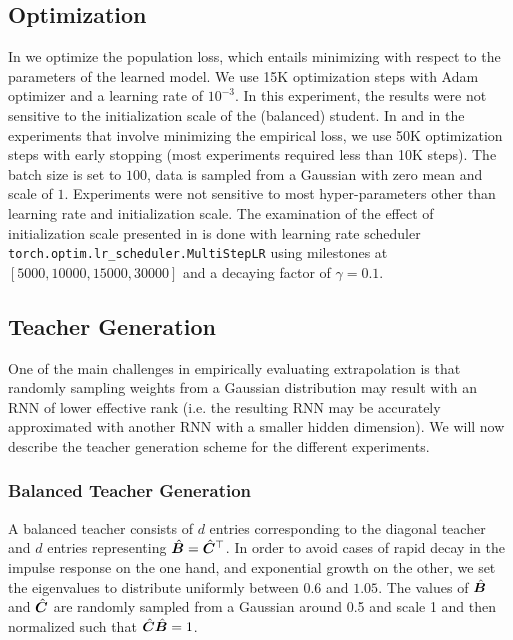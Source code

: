 \subsection{Optimization}
In  we optimize the population loss, which entails minimizing  with respect to the parameters of the learned model. We use 15K optimization steps with Adam optimizer and a learning rate of $10^{-3}$. In this experiment, the results were not sensitive to the initialization scale of the (balanced) student.
In  and  in the experiments that involve minimizing the empirical loss, we use 50K optimization steps with early stopping (most experiments required less than 10K steps). The batch size is set to $100$, data is sampled from a Gaussian with zero mean and scale of $1$. Experiments were not sensitive to most hyper-parameters other than learning rate and initialization scale. The examination of the effect of initialization scale presented in  is done with learning rate scheduler \verb|torch.optim.lr_scheduler.MultiStepLR| using milestones at $[5000,10000,15000,30000]$ and a decaying factor of $\gamma=0.1$.


\subsection{Teacher Generation}\label{sec:apdx:teacher_gen}
One of the main challenges in empirically evaluating extrapolation is that randomly sampling weights from a Gaussian distribution may result with an RNN of lower effective rank (i.e. the resulting RNN may be accurately approximated with another RNN with a smaller hidden dimension). We will now describe the teacher generation scheme for the different experiments.

\subsubsection{Balanced Teacher Generation}\label{sec:apdx:balanced_teacher_generation}
A balanced teacher consists of $d$ entries corresponding to the diagonal teacher and $d$ entries representing $\hat{{\bm{B}}}=\hat{{\bm{C}}}^\top$. In order to avoid cases of rapid decay in the impulse response on the one hand, and exponential growth on the other, we set the eigenvalues to distribute uniformly between $0.6$ and $1.05$. The values of $\hat{{\bm{B}}}$ and $\hat{{\bm{C}}}$ are randomly sampled from a Gaussian around 0.5 and scale 1 and then normalized such that $\hat{{\bm{C}}}\hat{{\bm{B}}}=1$.

